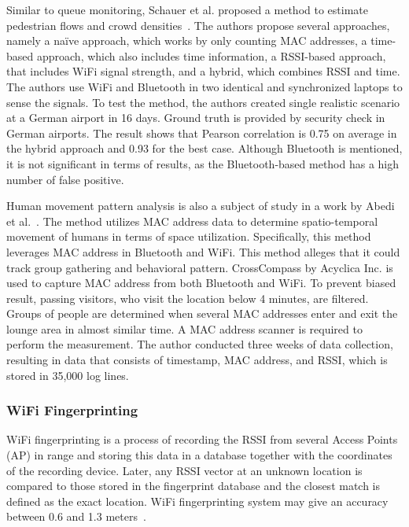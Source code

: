 	Similar to queue monitoring, Schauer et al. proposed a method to estimate pedestrian flows and crowd densities~\cite{thesis011}. The authors propose several approaches, namely a na\"{i}ve approach, which works by only counting MAC addresses, a time-based approach, which also includes time information, a \ac{RSSI}-based approach, that includes WiFi signal strength, and a hybrid, which combines \ac{RSSI} and time. The authors use WiFi and Bluetooth in two identical and synchronized laptops to sense the signals. To test the method, the authors created single realistic scenario at a German airport in 16 days.
	Ground truth is provided by security check in German airports. The result shows that Pearson correlation is 0.75 on average in the hybrid approach and 0.93 for the best case. Although Bluetooth is mentioned, it is not significant in terms of results, as the Bluetooth-based method has a high number of false positive. 

	Human movement pattern analysis is also a subject of study in a work by Abedi et al.~\cite{thesis017}. The method utilizes \ac{MAC} address data to determine spatio-temporal movement of humans in terms of space utilization. Specifically, this method leverages \ac{MAC} address in Bluetooth and WiFi. This method alleges that it could track group gathering and behavioral pattern. CrossCompass by Acyclica Inc. is used to capture \ac{MAC} address from both Bluetooth and WiFi. To prevent biased result, passing visitors, who visit the location below 4 minutes, are filtered. Groups of people are determined when several \ac{MAC} addresses enter and exit the lounge area in almost similar time. A \ac{MAC} address scanner is required to perform the measurement. The author conducted three weeks of data collection, resulting in data that consists of timestamp, \ac{MAC} address, and \ac{RSSI}, which is stored in 35,000 log lines.

	

	







	\subsubsection{WiFi Fingerprinting} %
	\label{ssub:wifi_fingerprinting}
	WiFi fingerprinting is a process of recording the \ac{RSSI} from several Access Points (\ac{AP}) in range and storing this data in a database together with the coordinates of the recording device. Later, any \ac{RSSI} vector at an unknown location is compared to those stored in the fingerprint database and the closest match is defined as the exact location. WiFi fingerprinting system may give an accuracy between 0.6 and 1.3 meters~\cite{Youssef2008}.

